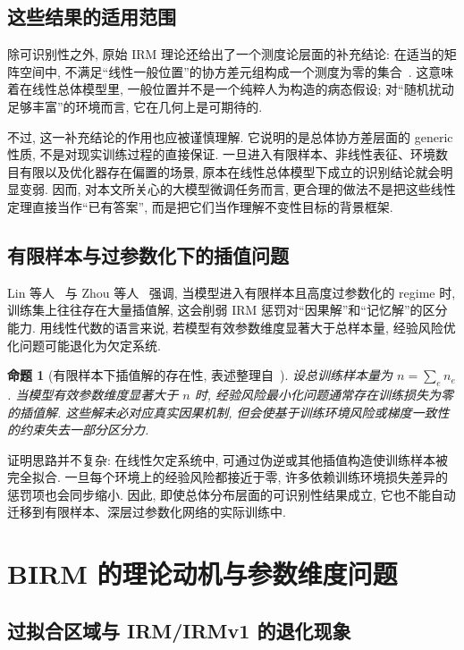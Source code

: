 \documentclass[a4paper,punct=banjiao,twoside]{ctexrep}
\theoremstyle{plain}
\newtheorem{prop}[thm]{命题}
\theoremstyle{definition}
\theoremstyle{remark}
\begin{document}
\subsection{这些结果的适用范围}

除可识别性之外, 原始 IRM 理论还给出了一个测度论层面的补充结论: 在适当的矩阵空间中, 不满足“线性一般位置”的协方差元组构成一个测度为零的集合~\cite{arjovsky2019invariant}. 这意味着在线性总体模型里, 一般位置并不是一个纯粹人为构造的病态假设; 对“随机扰动足够丰富”的环境而言, 它在几何上是可期待的.

不过, 这一补充结论的作用也应被谨慎理解. 它说明的是总体协方差层面的 generic 性质, 不是对现实训练过程的直接保证. 一旦进入有限样本、非线性表征、环境数目有限以及优化器存在偏置的场景, 原本在线性总体模型下成立的识别结论就会明显变弱. 因而, 对本文所关心的大模型微调任务而言, 更合理的做法不是把这些线性定理直接当作“已有答案”, 而是把它们当作理解不变性目标的背景框架.

\subsection{有限样本与过参数化下的插值问题}

Lin 等人~\cite{lin2022bayesian} 与 Zhou 等人~\cite{zhou2022sparse} 强调, 当模型进入有限样本且高度过参数化的 regime 时, 训练集上往往存在大量插值解, 这会削弱 IRM 惩罚对“因果解”和“记忆解”的区分能力. 用线性代数的语言来说, 若模型有效参数维度显著大于总样本量, 经验风险优化问题可能退化为欠定系统.

\begin{prop}[有限样本下插值解的存在性, 表述整理自~\cite{lin2022bayesian, zhou2022sparse}]
\label{prop:failure}
设总训练样本量为 $n=\sum_e n_e$. 当模型有效参数维度显著大于 $n$ 时, 经验风险最小化问题通常存在训练损失为零的插值解. 这些解未必对应真实因果机制, 但会使基于训练环境风险或梯度一致性的约束失去一部分区分力.
\end{prop}

证明思路并不复杂: 在线性欠定系统中, 可通过伪逆或其他插值构造使训练样本被完全拟合. 一旦每个环境上的经验风险都接近于零, 许多依赖训练环境损失差异的惩罚项也会同步缩小. 因此, 即使总体分布层面的可识别性结果成立, 它也不能自动迁移到有限样本、深层过参数化网络的实际训练中.

\section{BIRM 的理论动机与参数维度问题}

\subsection{过拟合区域与 IRM/IRMv1 的退化现象}
\end{document}
